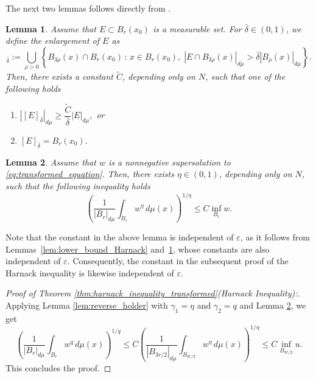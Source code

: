 \documentclass[11pt]{article}
\newtheorem{lemma}{Lemma}[section] %
\begin{document}
The next two lemmas follows directly from \cite[Lemma $4.10$ and $4.11$]{dipierro2016fractionalwithHardy}.
\begin{lemma} \label{lemma:measure_enlargement}
Assume that \( E \subset B_r(x_0) \) is a measurable set. For \( \bar{\delta} \in (0,1) \), we define the \emph{enlargement} of \( E \) as
\begin{equation*} 
[E]_{\bar{\delta}} := \bigcup_{\rho > 0} \left\{ B_{3\rho}(x) \cap B_r(x_0) \,:\, x \in B_r(x_0),\; |E \cap B_{3\rho}(x)|_{d\mu} > \bar{\delta} |B_{\rho}(x)|_{d\mu} \right\}.
\end{equation*}
Then, there exists a constant \( \tilde{C} \), depending only on \( N \), such that one of the following holds
\begin{enumerate}
    \item \( |[E]_{\bar{\delta}}|_{d\mu} \geq \dfrac{\tilde{C}}{\bar{\delta}} |E|_{d\mu}, \) or
    \item \( [E]_{\bar{\delta}} = B_r(x_0). \)
\end{enumerate}
\end{lemma}
\begin{lemma}\label{lemma:main_supersolution}
Assume that \( w \) is a nonnegative supersolution to \eqref{eq:transformed_equation}. Then, there exists \( \eta \in (0,1) \), depending only on \( N \), such that the following inequality holds
\begin{equation*} 
\left( \frac{1}{|B_r|_{d\mu}} \int_{B_r} w^{\eta} \, d\mu(x) \right)^{1/\eta} \leq C \inf_{B_r} w.
\end{equation*}
\end{lemma}
Note that the constant in the above lemma is independent of $\varepsilon$, as it follows from Lemmas~\ref{lem:lower_bound_Harnack} and~\ref{lemma:measure_enlargement}, whose constants are also independent of $\varepsilon$. Consequently, the constant in the subsequent proof of the Harnack inequality is likewise independent of $\varepsilon$.
\begin{proof}[Proof of Theorem \ref{thm:harnack_inequality_transformed}(Harnack Inequality):]
Applying Lemma \ref{lem:reverse_holder} with $\gamma_1 = \eta$ and $\gamma_2 = q$ and Lemma \ref{lemma:main_supersolution}, we get 
\begin{equation*}
    \left( \frac{1}{|B_r|_{d\mu}} \int_{B_r} w^{q} \, d\mu(x) \right)^{1/q} \leq C  \left( \frac{1}{|B_{3r/2}|_{d\mu}} \int_{B_{3r/2}} w^{\eta} \, d\mu(x) \right)^{1/\eta} \leq C \inf_{B_{3r/2}} u.
\end{equation*}
This concludes the proof. 
\end{proof}
\end{document}
